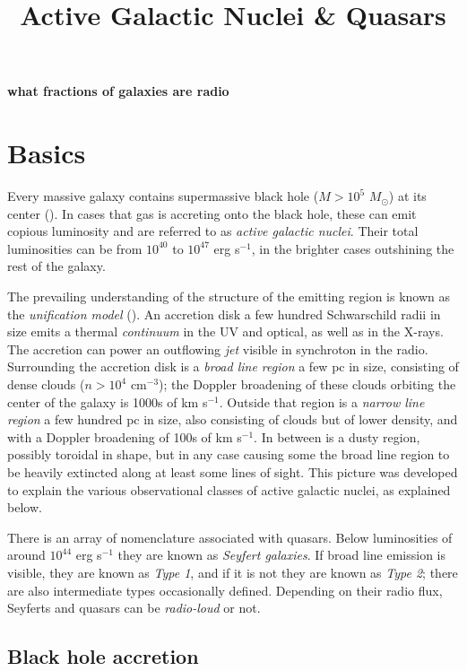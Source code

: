 \title{\bf Active Galactic Nuclei \& Quasars}

{\bf what fractions of galaxies are radio}

\section{Basics}

Every massive galaxy contains supermassive black hole ($M> 10^5$
$M_\odot$) at its center (\citealt{kormendy13a}). In cases that gas is
accreting onto the black hole, these can emit copious luminosity and
are referred to as {\it active galactic nuclei}. Their total
luminosities can be from $10^{40}$ to $10^{47}$ erg s$^{-1}$, in the
brighter cases outshining the rest of the galaxy.

The prevailing understanding of the structure of the emitting region
is known as the {\it unification model} (\citealt{antonucci93a,
netzer15a}). An accretion disk a few hundred Schwarschild radii in
size emits a thermal {\it continuum} in the UV and optical, as well as
in the X-rays. The accretion can power an outflowing {\it jet} visible
in synchroton in the radio. Surrounding the accretion disk is a {\it
broad line region} a few pc in size, consisting of dense clouds
($n>10^4$ cm$^{-3}$); the Doppler broadening of these clouds orbiting
the center of the galaxy is 1000s of km s$^{-1}$. Outside that region
is a {\it narrow line region} a few hundred pc in size, also
consisting of clouds but of lower density, and with a Doppler
broadening of 100s of km s$^{-1}$. In between is a dusty region,
possibly toroidal in shape, but in any case causing some the broad
line region to be heavily extincted along at least some lines of
sight. This picture was developed to explain the various observational
classes of active galactic nuclei, as explained below.

There is an array of nomenclature associated with quasars. Below
luminosities of around $10^{44}$ erg s$^{-1}$ they are known as {\it
Seyfert galaxies}. If broad line emission is visible, they are known
as {\it Type 1}, and if it is not they are known as {\it Type 2};
there are also intermediate types occasionally defined. Depending on
their radio flux, Seyferts and quasars can be {\it radio-loud} or not.

\subsection{Black hole accretion}

